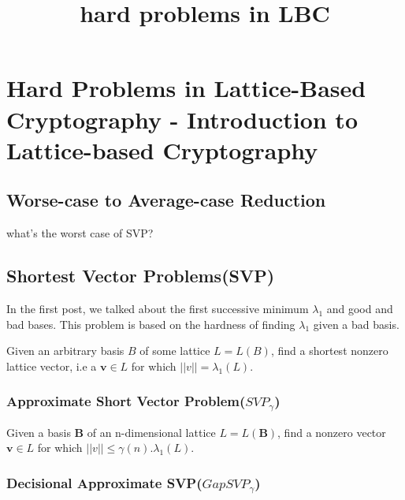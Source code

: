 \documentclass[11pt]{article}
\title{hard problems in LBC}
\begin{document}
    
    \maketitle
    
    

    
    \section{Hard Problems in Lattice-Based Cryptography - Introduction to
Lattice-based
Cryptography}\label{hard-problems-in-lattice-based-cryptography---introduction-to-lattice-based-cryptography}

    \subsection{Worse-case to Average-case
Reduction}\label{worse-case-to-average-case-reduction}

what's the worst case of SVP?

    \subsection{Shortest Vector
Problems(SVP)}\label{shortest-vector-problemssvp}

In the first post, we talked about the first successive minimum
\(\lambda_1\) and good and bad bases. This problem is based on the
hardness of finding \(\lambda_1\) given a bad basis.

Given an arbitrary basis \(B\) of some lattice \(L = L(B)\), find a
shortest nonzero lattice vector, i.e a \(\mathbf{v} \in L\) for which
\(||v|| = \lambda_1(L)\).

\subsubsection{\texorpdfstring{Approximate Short Vector
Problem(\(SVP_{\gamma}\))}{Approximate Short Vector Problem(SVP\_\{\textbackslash gamma\})}}\label{approximate-short-vector-problemsvp_gamma}

Given a basis \(\mathbf{B}\) of an n-dimensional lattice
\(L = L(\mathbf{B})\), find a nonzero vector \(\mathbf{v} \in L\) for
which \(||v|| \leq \gamma(n).\lambda_{1}(L)\).

\subsubsection{\texorpdfstring{Decisional Approximate
SVP(\(GapSVP_{\gamma}\))}{Decisional Approximate SVP(GapSVP\_\{\textbackslash gamma\})}}\label{decisional-approximate-svpgapsvp_gamma}
\end{document}
